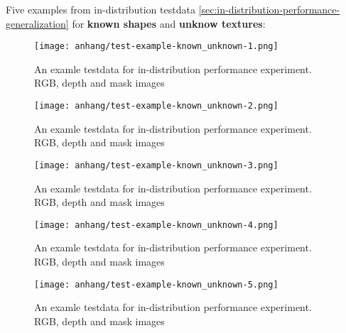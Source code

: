 	
	\FloatBarrier
	\clearpage
	Five examples from in-distribution testdata \ref{sec:in-distribution-performance-generalization} for \textbf{known shapes} and \textbf{unknow textures}:
	\begin{figure}[H]
		\centering
		\texttt{[image: anhang/test-example-known\_unknown-1.png]}
		\caption[An examle testdata for in-distribution performance experiment. RGB, depth and mask images]{An examle testdata for in-distribution performance experiment. RGB, depth and mask images}
	\end{figure}
	\begin{figure}[H]
		\centering
		\texttt{[image: anhang/test-example-known\_unknown-2.png]}
		\caption[An examle testdata for in-distribution performance experiment. RGB, depth and mask images]{An examle testdata for in-distribution performance experiment. RGB, depth and mask images}
	\end{figure}
	\begin{figure}[H]
		\centering
		\texttt{[image: anhang/test-example-known\_unknown-3.png]}
		\caption[An examle testdata for in-distribution performance experiment. RGB, depth and mask images]{An examle testdata for in-distribution performance experiment. RGB, depth and mask images}
	\end{figure}
	\begin{figure}[H]
		\centering
		\texttt{[image: anhang/test-example-known\_unknown-4.png]}
		\caption[An examle testdata for in-distribution performance experiment. RGB, depth and mask images]{An examle testdata for in-distribution performance experiment. RGB, depth and mask images}
	\end{figure}
	\begin{figure}[H]
		\centering
		\texttt{[image: anhang/test-example-known\_unknown-5.png]}
		\caption[An examle testdata for in-distribution performance experiment. RGB, depth and mask images]{An examle testdata for in-distribution performance experiment. RGB, depth and mask images}
	\end{figure}
	
	
	
